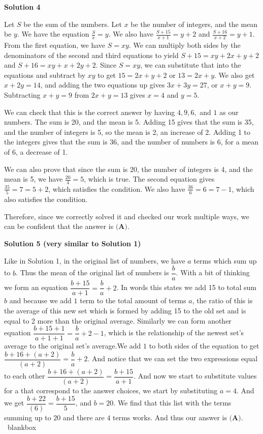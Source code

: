 \begin{enumerate}
\textbf{Solution 4}

Let $S$ be the sum of the numbers. Let $x$ be the number of integers, and the mean be $y$. We have the equation $\frac{S}{x} = y$. We also have $\frac{S+15}{x+1} = y+2$ and $\frac{S+16}{x+2} = y+1$. From the first equation, we have $S = xy$. We can multiply both sides by the denominators of the second and third equations to yield $S+15 = xy+2x+y+2$ and $S+16 = xy+x+2y+2$. Since $S = xy$, we can substitute that into the equations and subtract by $xy$ to get $15 = 2x+y+2$ or $13 = 2x+y$. We also get $x+2y = 14$, and adding the two equations up gives $3x+3y = 27$, or $x+y = 9$. Subtracting $x+y=9$ from $2x+y=13$ gives $x = 4$ and $y = 5$. 

 We can check that this is the correct answer by having $4, 9, 6,$ and $1$ as our numbers. The sum is 20, and the mean is 5. Adding 15 gives that the sum is 35, and the number of integers is 5, so the mean is 2, an increase of 2. Adding 1 to the integers gives that the sum is 36, and the number of numbers is 6, for a mean of 6, a decrease of 1.

 We can also prove that since the sum is 20, the number of integers is 4, and the mean is 5, we have $\frac{20}{4} = 5$, which is true. The second equation gives $\frac{35}{5} = 7 = 5+2$, which satisfies the condition. We also have $\frac{36}{6} = 6 = 7-1$, which also satisfies the condition.

 Therefore, since we correctly solved it and checked our work multiple ways, we can be confident that the answer is $\textbf{(A)}$.

 



\textbf{Solution 5 (very similar to Solution 1)}

Like in Solution 1, in the original list of numbers, we have $a$ terms which sum up to $b$. Thus the mean of the original list of numbers is $\dfrac{b}{a}$. With a bit of thinking we form an equation $\dfrac{b+15}{a+1}=\dfrac{b}{a}+2$. In words this states we add 15 to total sum $b$ and because we add $1$ term to the total amount of terms $a$, the ratio of this is the average of this new set which is formed by adding 15 to the old set and is equal to 2 more than the original average. Similarly we can form another equation $\dfrac{b+15+1}{a+1+1}=\dfrac{b}{a}+2-1$, which is the relationship of the newest set's average to the original set's average.We add $1$ to both sides of the equation to get $\dfrac{b+16+(a+2)}{(a+2)}=\dfrac{b}{a}+2$. And notice that we can set the two expressions equal to each other $\dfrac{b+16+(a+2)}{(a+2)}=\dfrac{b+15}{a+1}$. And now we start to substitute values for a that correspond to the answer choices, we start by substituting $a=4$. And we get $\dfrac{b+22}{(6)}=\dfrac{b+15}{5}$, and $b=20$. We find that this list with the terms summing up to $20$ and there are $4$ terms works. And thus our answer is $\textbf{(A)}$. ~blankbox


\end{enumerate}
